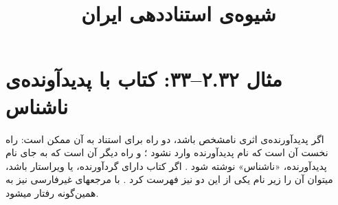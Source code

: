 \documentclass[a4paper,10pt]{article}
\begin{document}
\title{شیوه‌ی استناددهی ایران
 }
\author{}
\date{}
\maketitle



\section*{مثال ۲.۳۲--۳۳: کتاب با پدیدآونده‌ی ناشناس}

اگر پدیدآورنده‌ی اثری نامشخص باشد، دو راه برای استناد به آن ممکن است: راه نخست آن است که نام پدیدآورنده وارد نشود \cite[مانند][]{هزارویک1378}؛ و راه دیگر آن است که به جای نام پدیدآورنده، «ناشناس» نوشته شود \cite[مانند][]{ناشناس1378,ناشناس1362}. اگر کتاب دارای گردآورنده، یا ویراستار باشد، میتوان آن را زیر نام یکی از این دو نیز فهرست کرد \cite[مانند][]{افراسیابی1378}. با مرجعهای غیرفارسی نیز به همین‌گونه رفتار میشود.
\nocite{*}






\end{document}
